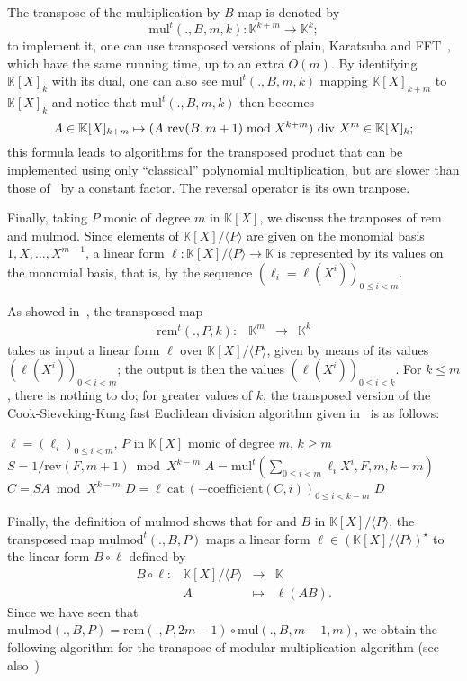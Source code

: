 \documentclass[12pt]{article}
\def\K {\ensuremath{\mathbb{K}}}
\def\mul {\ensuremath{\mathrm{mul}}}
\def\rem {\ensuremath{\mathrm{rem}}}
\def\cat {\ensuremath{\mathrm{cat}}}
\def\coeff {\ensuremath{\mathrm{coefficient}}}
\def\mulmod {\ensuremath{\mathrm{mulmod}}}
\def\rev {\ensuremath{\mathrm{rev}}}
\begin{document}
The transpose of the multiplication-by-$B$ map is denoted by
$$\mul^t(.,B,m,k): \K^{k+m} \to \K^k;$$ to implement it, one can use
transposed versions of plain, Karatsuba and
FFT~\cite{bostan+lecerf+schost:tellegen,hanrot+quercia+zimmermann},
which have the same running time, up to an extra $O(m)$.
By identifying $\K[X]_k$ with its dual, one can also see
$\mul^t(.,B,m,k)$ mapping $\K[X]_{k+m}$ to $\K[X]_{k}$ and notice that
$\mul^t(.,B,m,k)$ then becomes $$A \in \K[X]_{k+m} \mapsto
(A\ \rev(B,m+1) \bmod X^{k+m}){\rm~div~}X^{m} \in \K[X]_k;$$ this
formula leads to algorithms for the transposed product that can be
implemented using only ``classical'' polynomial multiplication, but
are slower than those
of~\cite{bostan+lecerf+schost:tellegen,hanrot+quercia+zimmermann} by a
constant factor. The reversal operator is its own tranpose.

Finally, taking $P$ monic of degree $m$ in $\K[X]$, we discuss the
tranposes of $\rem$ and $\mulmod$. Since elements of $\K[X]/\langle P
\rangle$ are given on the monomial basis $1,X,\dots,X^{m-1}$, a linear
form $\ell: \K[X]/\langle P \rangle \to \K$ is represented by its
values on the monomial basis, that is, by the sequence
$(\ell_i=\ell(X^i))_{0 \le i < m}$.

As showed in~\cite{bostan+lecerf+schost:tellegen}, the transposed map
$$
\begin{array}{cccc}
\rem^t(.,P,k): &\K^m& \to &\K^k
\end{array}$$ 
takes as input a linear form $\ell$ over $\K[X]/\langle P \rangle$,
given by means of its values $(\ell(X^i))_{0 \le i < m}$; the output
is then the values $(\ell(X^i))_{0 \le i < k}$. For $k \le m$, there
is nothing to do; for greater values of $k$, the transposed version of
the Cook-Sieveking-Kung fast Euclidean division algorithm given
in~\cite{bostan+lecerf+schost:tellegen} is as follows:

\begin{algorithm}[H]
  \caption{$\rem^t(\ell,P,k)$}
  \begin{algorithmic}[1]
    \REQUIRE $\ell=(\ell_i)_{0 \le i < m}$, $P$ in $\K[X]$ monic of degree $m$, $k \ge m$
    \STATE $S = 1/\rev(F, m+1) \bmod X^{k-m}$
    \STATE $A = \mul^t( \sum_{0 \le i < m} \ell_{i}X^i, F, m, k-m)$
    \STATE $C = S A \bmod X^{k-m}$
    \STATE $D = \ell ~\cat~ (-\coeff(C,i))_{0 \le i < k-m}$
    \RETURN $D$
  \end{algorithmic}
\end{algorithm}

Finally, the definition of $\mulmod$ shows that for and $B$ in
$\K[X]/\langle P \rangle$, the transposed map $\mulmod^t(.,B,P)$ maps
a linear form $\ell \in (\K[X]/\langle P \rangle)^\star$ to the linear
form $B \circ \ell$ defined by
$$
\begin{array}{cccc}
B \circ \ell: &\K[X]/\langle P \rangle &\to& \K  \\
& A & \mapsto & \ell(A B).
\end{array}$$
Since we have seen that $\mulmod(.,B,P) = \rem(.,P,2m-1) \circ \mul(.,B,m-1,m)$,
we obtain the following algorithm for the transpose of modular multiplication
algorithm (see also~\cite{shoup99,bostan+lecerf+schost:tellegen})
\end{document}
